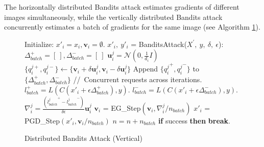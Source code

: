 
The horizontally distributed Bandits attack estimates gradients of different images simultaneously, while the vertically distributed Bandits attack concurrently estimates a batch of gradients for the same image (see Algorithm \ref{alg:bandits_vertical}).



\begin{figure}[H]
\begin{minipage}{\textwidth}
\begin{algorithm}[H]
    \centering
    \caption{Distributed Bandits Attack (Vertical)}
    \label{alg:bandits_vertical}
    \begin{algorithmic}[1]
            \State Initialize: $x'_i = x_i, \boldsymbol{v}_i =\emptyset$.
            \State $x'_i,\ y'_{i}$ = BanditsAttack($X^{'},\ y,\ \delta,\ \epsilon$):
            \Indent
                \For {each iteration $n \in [0,\ n_{iter})$}
                    \State $\Delta^+_{batch} = [\ ], \Delta^-_{batch} = [\ ]$
                            \State $\boldsymbol{u}_i^j = \mathcal{N}(0, \frac{1}{d_i}I)$
                            \State $\{q_{i}^{j+}, q_{i}^{j-}\} \leftarrow \{\boldsymbol{v}_i + \delta \boldsymbol{u}_i^j, {\boldsymbol{v}_i - \delta \boldsymbol{u}_i^j}\}$
                            \State Append $\{{q_{i}^{j}}^+, {q_{i}^{j}}^-\}$ to $\{\Delta_{batch}^+, \Delta_{batch}^-\}$ 
                    \EndFor
                    \State //\ Concurrent requests across iterations.
                    \State $l^+_{batch} = L(C(x{'}_i + \epsilon\Delta_{batch}^+), y)$.
                    \State $l^-_{batch} = L(C(x{'}_i + \epsilon\Delta_{batch}^-), y)$.
                        \State $\nabla_i^j = \frac{({l^j_{batch}}^+ - {l^j_{batch}}^-)}{\delta\epsilon} \boldsymbol{u}_i^j$
                        \State $\boldsymbol{v}_i$ = EG\_Step$(\boldsymbol{v}_i, \nabla_i^j / n_{batch})$
                        \State $x'_i$ = PGD\_Step$(x'_i, \boldsymbol{v}_i / n_{batch})$
                    \EndFor
                    \State $n = n + n_{batch}$
                    \State \textbf{if} {success} \textbf{then} {\textbf{break}}.
                \EndFor
            \EndIndent
        \EndFor
    \end{algorithmic}
\end{algorithm}
\end{minipage}
\end{figure}


